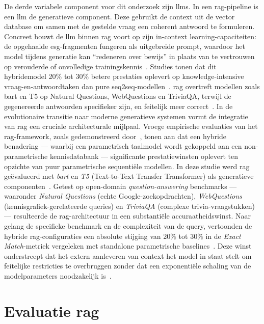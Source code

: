 De derde variabele component voor dit onderzoek zijn \glspl{llm}. In een \gls{rag}-pipeline is een \gls{llm} de generatieve component. Deze gebruikt de context uit de vector database om samen met de gestelde vraag een coherent antwoord te formuleren. Concreet bouwt de \gls{llm} binnen \gls{rag} voort op zijn in-context learning-capaciteiten: de opgehaalde \gls{esg}-fragmenten fungeren als uitgebreide prompt, waardoor het model tijdens generatie kan ``redeneren over bewijs'' in plaats van te vertrouwen op verouderde of onvolledige trainingskennis~\autocite{Wang2025}. Studies tonen dat dit hybridemodel 20\% tot 30\% betere prestaties oplevert op knowledge-intensive vraag-en-antwoordtaken dan pure seq2seq-modellen~\autocite{Lewis2020}. \gls{rag} overtreft modellen zoals \gls{bart} en T5 op Natural Questions, WebQuestions en TriviaQA, terwijl de gegenereerde antwoorden specifieker zijn, en feitelijk meer correct~\autocite{Lewis2020}. In de evolutionaire transitie naar moderne generatieve systemen vormt de integratie van \gls{rag} een cruciale architecturale mijlpaal. Vroege empirische evaluaties van het \gls{rag}-framework, zoals gedemonstreerd door~\textcite{Lewis2020}, tonen aan dat een hybride benadering — waarbij een parametrisch taalmodel wordt gekoppeld aan een non-parametrische kennisdatabank — significante prestatiewinsten oplevert ten opzichte van puur parametrische sequentiële modellen. In deze studie werd \gls{rag} geëvalueerd met \textit{\gls{bart}} en \textit{T5} (Text-to-Text Transfer Transformer) als generatieve componenten~\autocite{Lewis2020}. Getest op open-domain \textit{question-answering} benchmarks — waaronder \textit{Natural Questions} (echte Google-zoekopdrachten), \textit{WebQuestions} (kennisgrafiek-gerelateerde queries) en \textit{TriviaQA} (complexe trivia-vraagstukken) — resulteerde de \gls{rag}-architectuur in een substantiële accuraatheidswinst. Naar gelang de specifieke benchmark en de complexiteit van de query, vertoonden de hybride \gls{rag}-configuraties een absolute stijging van 20\% tot 30\% in de \textit{Exact Match}-metriek vergeleken met standalone parametrische baselines~\autocite{Lewis2020}. Deze winst onderstreept dat het extern aanleveren van context het model in staat stelt om feitelijke restricties te overbruggen zonder dat een exponentiële schaling van de modelparameters noodzakelijk is~\autocite{Lewis2020}.

\section{Evaluatie \gls{rag}}

